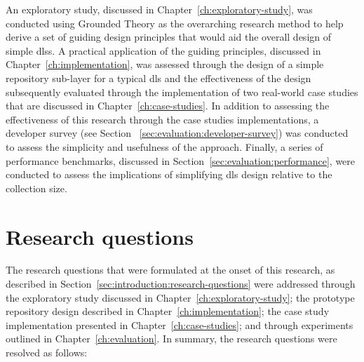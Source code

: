 % 

An exploratory study, discussed in Chapter~\ref{ch:exploratory-study}, was conducted using Grounded Theory as the overarching research method to help derive a set of guiding design principles that would aid the overall design of simple \glspl{dls}. A practical application of the guiding principles, discussed in Chapter~\ref{ch:implementation}, was assessed through the design of a simple repository sub-layer for a typical \gls{dls} and the effectiveness of the design subsequently evaluated through the implementation of two real-world case studies that are discussed in Chapter~\ref{ch:case-studies}. In addition to assessing the effectiveness of this research through the case studies implementations, a developer survey (see Section ~\ref{sec:evaluation:developer-survey}) was conducted to assess the simplicity and usefulness of the approach. Finally, a series of performance benchmarks, discussed in Section~\ref{sec:evaluation:performance}, were conducted to assess the implications of simplifying \gls{dls} design relative to the collection size.

% 


% 








% 

\section{Research questions}
\label{sec:conclusion:research-questions}

The research questions that were formulated at the onset of this research, as described in Section~\ref{sec:introduction:research-questions} were addressed through the exploratory study discussed in Chapter~\ref{ch:exploratory-study}; the prototype repository design described in Chapter~\ref{ch:implementation}; the case study implementation presented in Chapter~\ref{ch:case-studies}; and through experiments outlined in Chapter~\ref{ch:evaluation}. In summary, the research questions were resolved as follows:

